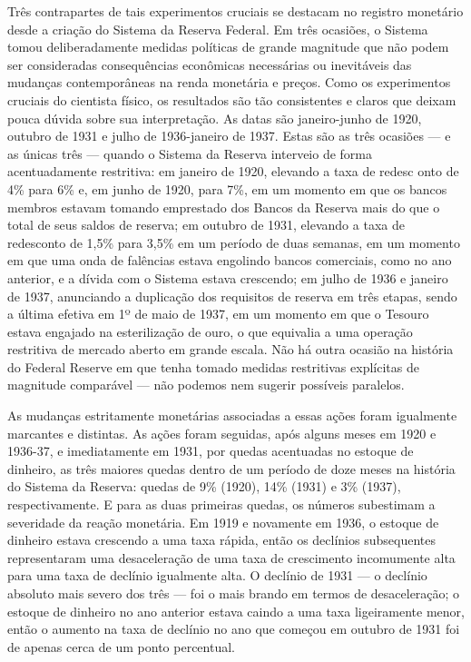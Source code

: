 \documentclass[12pt]{article}
\begin{document}
Três contrapartes de tais experimentos cruciais se destacam no registro monetário desde a criação do Sistema da Reserva Federal. Em três ocasiões, o Sistema tomou deliberadamente medidas políticas de grande magnitude que não podem ser consideradas consequências econômicas necessárias ou inevitáveis das mudanças contemporâneas na renda monetária e preços. Como os experimentos cruciais do cientista físico, os resultados são tão consistentes e claros que deixam pouca dúvida sobre sua interpretação. As datas são janeiro-junho de 1920, outubro de 1931 e julho de 1936-janeiro de 1937. Estas são as três ocasiões — e as únicas três — quando o Sistema da Reserva interveio de forma acentuadamente restritiva: em janeiro de 1920, elevando a taxa de redesc
onto de 4\% para 6\% e, em junho de 1920, para 7\%, em um momento em que os bancos membros estavam tomando emprestado dos Bancos da Reserva mais do que o total de seus saldos de reserva; em outubro de 1931, elevando a taxa de redesconto de 1,5\% para 3,5\% em um período de duas semanas, em um momento em que uma onda de falências estava engolindo bancos comerciais, como no ano anterior, e a dívida com o Sistema estava crescendo; em julho de 1936 e janeiro de 1937, anunciando a duplicação dos requisitos de reserva em três etapas, sendo a última efetiva em 1º de maio de 1937, em um momento em que o Tesouro estava engajado na esterilização de ouro, o que equivalia a uma operação restritiva de mercado aberto em grande escala. Não há outra ocasião na história do Federal Reserve em que tenha tomado medidas restritivas explícitas de magnitude comparável — não podemos nem sugerir possíveis paralelos.

As mudanças estritamente monetárias associadas a essas ações foram igualmente marcantes e distintas. As ações foram seguidas, após alguns meses em 1920 e 1936-37, e imediatamente em 1931, por quedas acentuadas no estoque de dinheiro, as três maiores quedas dentro de um período de doze meses na história do Sistema da Reserva: quedas de 9\% (1920), 14\% (1931) e 3\% (1937), respectivamente. E para as duas primeiras quedas, os números subestimam a severidade da reação monetária. Em 1919 e novamente em 1936, o estoque de dinheiro estava crescendo a uma taxa rápida, então os declínios subsequentes representaram uma desaceleração de uma taxa de crescimento incomumente alta para uma taxa de declínio igualmente alta. O declínio de 1931 — o declínio absoluto mais severo dos três — foi o mais brando em termos de desaceleração; o estoque de dinheiro no ano anterior estava caindo a uma taxa ligeiramente menor, então o aumento na taxa de declínio no ano que começou em outubro de 1931 foi de apenas cerca de um ponto percentual.
\end{document}
